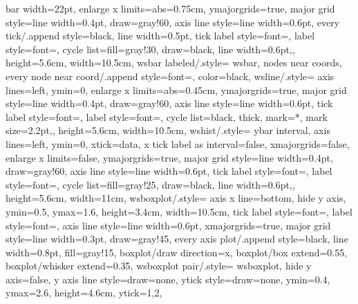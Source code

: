 {{    bar width=22pt,
    enlarge x limits={abs=0.75cm},
    ymajorgrids=true,
    major grid style={line width=0.4pt, draw=gray!60},
    axis line style={line width=0.6pt},
    every tick/.append style={black, line width=0.5pt},
    tick label style={font=\small},
    label style={font=\small},
    cycle list={{fill=gray!30, draw=black, line width=0.6pt},},
    height=5.6cm, width=10.5cm},
  wsbar labeled/.style={
    wsbar,
    nodes near coords,
    every node near coord/.append style={font=\small, color=black}},
  wsline/.style={
    axis lines=left, ymin=0,
    enlarge x limits={abs=0.45cm},
    ymajorgrids=true,
    major grid style={line width=0.4pt, draw=gray!60},
    axis line style={line width=0.6pt},
    tick label style={font=\small},
    label style={font=\small},
    cycle list={{black, thick, mark=*, mark size=2.2pt},},
    height=5.6cm, width=10.5cm},
  wshist/.style={
    ybar interval, axis lines=left, ymin=0,
    xtick=data,
    x tick label as interval=false,
    xmajorgrids=false, enlarge x limits=false,
    ymajorgrids=true,
    major grid style={line width=0.4pt, draw=gray!60},
    axis line style={line width=0.6pt},
    tick label style={font=\small},
    label style={font=\small},
    cycle list={{fill=gray!25, draw=black, line width=0.6pt},},
    height=5.6cm, width=11cm},
  wsboxplot/.style={
    axis x line=bottom,
    hide y axis,
    ymin=0.5, ymax=1.6,
    height=3.4cm, width=10.5cm,
    tick label style={font=\small},
    label style={font=\small},
    axis line style={line width=0.6pt},
    xmajorgrids=true,
    major grid style={line width=0.3pt, draw=gray!45},
    every axis plot/.append style={black, line width=0.8pt, fill=gray!15},
    boxplot/draw direction=x,
    boxplot/box extend=0.55,
    boxplot/whisker extend=0.35},
  wsboxplot pair/.style={
    wsboxplot,
    hide y axis=false,
    y axis line style={draw=none},
    ytick style={draw=none},
    ymin=0.4, ymax=2.6,
    height=4.6cm,
    ytick={1,2}},
}

